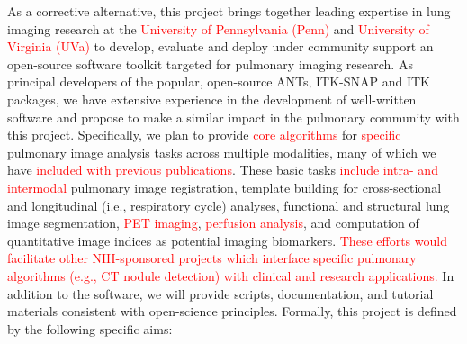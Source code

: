\documentclass[11pt,]{article}
\begin{document}
As a corrective alternative, this project brings together leading
expertise in lung imaging research at the
\textcolor{red}{University of Pennsylvania (Penn)} and
\textcolor{red}{University of Virginia (UVa)} to develop, evaluate and
deploy under community support an open-source software toolkit targeted
for pulmonary imaging research. As principal developers of the popular,
open-source ANTs, ITK-SNAP and ITK packages, we have extensive
experience in the development of well-written software and propose to
make a similar impact in the pulmonary community with this project.
Specifically, we plan to provide \textcolor{red}{core algorithms} for
\textcolor{red}{specific} pulmonary image analysis tasks across multiple
modalities, many of which we have
\textcolor{red}{included with previous publications}. These basic tasks
\textcolor{red}{include intra- and intermodal} pulmonary image
registration, template building for cross-sectional and longitudinal
(i.e., respiratory cycle) analyses, functional and structural lung image
segmentation, \textcolor{red}{PET imaging},
\textcolor{red}{perfusion analysis}, and computation of quantitative
image indices as potential imaging biomarkers.
\textcolor{red}{These efforts would
facilitate other NIH-sponsored projects} \textcolor{red}{
which interface specific pulmonary algorithms (e.g., CT nodule detection) with clinical
and research applications.} In addition to the software, we will provide
scripts, documentation, and tutorial materials consistent with
open-science principles. Formally, this project is defined by the
following specific aims:
\end{document}
